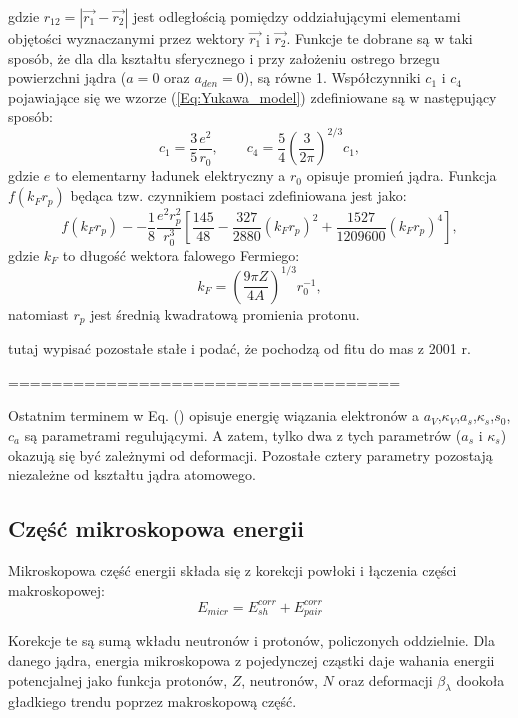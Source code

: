 \documentclass[polish]{article}
\numberwithin{equation}{section}
\begin{document}
gdzie $r_{12}=\left|\vec{r_{1}}-\vec{r_{2}}\right|$ jest odległością pomiędzy oddziałującymi elementami objętości 
wyznaczanymi przez wektory $\vec{r_{1}}$ i $\vec{r_{2}}$. Funkcje te dobrane są w taki sposób, że dla
dla kształtu sferycznego i przy założeniu ostrego brzegu powierzchni jądra ($a=0$ oraz $a_{den}=0$), są równe 1.
Współczynniki $c_{1}$ i $c_{4}$ pojawiające się we wzorze (\ref{Eq:Yukawa_model}) zdefiniowane są w następujący sposób:
\begin{equation}
c_{1}=\frac{3}{5}\frac{e^{2}}{r_{0}}, \qquad
c_{4}=\frac{5}{4}\left(\frac{3}{2\pi}\right)^{2/3}c_{1},
\end{equation}
gdzie $e$ to elementarny ładunek elektryczny a $r_{0}$ opisuje promień jądra. 
Funkcja $f(k_{F}r_{p})$ będąca tzw. czynnikiem postaci zdefiniowana jest jako:
\begin{equation}
f(k_{F}r_{p})--\frac{1}{8}\frac{e^{2}r^{2}_{p}}{r^{3}_{0}}\left[\frac{145}{48}-\frac{327}{2880}(k_{F}r_{p})^{2}+\frac{1527}{1209600}(k_{F}r_{p})^{4}\right],
\end{equation}
gdzie $k_{F}$ to długość wektora falowego Fermiego:
\begin{equation}
k_{F}=\left(\frac{9\pi Z}{4A}\right)^{1/3}r^{-1}_{0},
\end{equation}
natomiast $r_{p}$ jest średnią kwadratową promienia protonu. 


tutaj wypisać pozostałe stałe i podać, że pochodzą od fitu do mas z 2001 r.

====================================




Ostatnim terminem w Eq. () opisuje energię wiązania elektronów a $a_{V}$,$\kappa_{V}$,$a_{s}$,$\kappa_{s}$,$s_{0}$,$c_{a}$ są parametrami regulującymi. A zatem, tylko dwa z tych parametrów ($a_{s}$ i $\kappa_{s}$) okazują się być zależnymi od deformacji. Pozostałe cztery parametry pozostają niezależne od kształtu jądra atomowego.

\subsection{Część mikroskopowa energii}
Mikroskopowa część energii składa się z korekcji powłoki i łączenia części makroskopowej:
\begin{equation}
E_{micr}=E^{corr}_{sh}+E^{corr}_{pair}
\end{equation}

Korekcje te są sumą wkładu neutronów i protonów, policzonych oddzielnie. Dla danego jądra, energia mikroskopowa z pojedynczej cząstki daje wahania energii potencjalnej jako funkcja protonów, $Z$, neutronów, $N$ oraz deformacji $\beta_{\lambda}$ dookoła gładkiego trendu poprzez makroskopową część.
\end{document}
